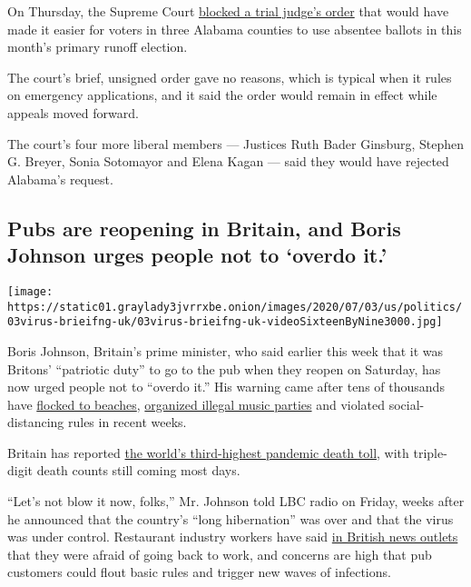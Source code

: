 On Thursday, the Supreme Court
\href{https://www.supremecourt.gov/orders/courtorders/070220zr_n7io.pdf}{blocked
a trial judge's order} that would have made it easier for voters in
three Alabama counties to use absentee ballots in this month's primary
runoff election.

The court's brief, unsigned order gave no reasons, which is typical when
it rules on emergency applications, and it said the order would remain
in effect while appeals moved forward.

The court's four more liberal members --- Justices Ruth Bader Ginsburg,
Stephen G. Breyer, Sonia Sotomayor and Elena Kagan --- said they would
have rejected Alabama's request.

\hypertarget{pubs-are-reopening-in-britain-and-boris-johnson-urges-people-not-to-overdo-it}{%
\subsection{Pubs are reopening in Britain, and Boris Johnson urges
people not to `overdo
it.'}\label{pubs-are-reopening-in-britain-and-boris-johnson-urges-people-not-to-overdo-it}}

\texttt{[image: https://static01.graylady3jvrrxbe.onion/images/2020/07/03/us/politics/03virus-brieifng-uk/03virus-brieifng-uk-videoSixteenByNine3000.jpg]}

Boris Johnson, Britain's prime minister, who said earlier this week that
it was Britons' ``patriotic duty'' to go to the pub when they reopen on
Saturday, has now urged people not to ``overdo it.'' His warning came
after tens of thousands have
\href{https://www.nytimes3xbfgragh.onion/2020/06/26/world/europe/uk-coronavirus-lockdown.html}{flocked
to beaches},
\href{https://www.nytimes3xbfgragh.onion/2020/06/25/world/europe/brixton-party-police.html}{organized
illegal music parties} and violated social-distancing rules in recent
weeks.

Britain has reported
\href{https://www.nytimes3xbfgragh.onion/interactive/2020/world/europe/united-kingdom-coronavirus-cases.html}{the
world's third-highest pandemic death toll}, with triple-digit death
counts still coming most days.

``Let's not blow it now, folks,'' Mr. Johnson told LBC radio on Friday,
weeks after he announced that the country's ``long hibernation'' was
over and that the virus was under control. Restaurant industry workers
have said
\href{https://www.independent.co.uk/life-style/pubs-reopening-super-saturday-social-distancing-hospitality-rules-a9598106.html}{in
British news outlets} that they were afraid of going back to work, and
concerns are high that pub customers could flout basic rules and trigger
new waves of infections.

